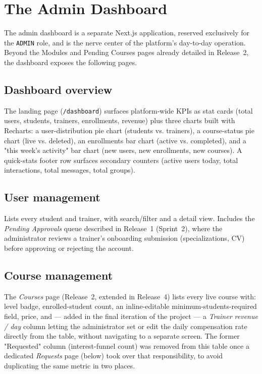 \documentclass[a4paper,12pt]{report}
\begin{document}
\chapter{The Admin Dashboard}
\label{chap:admin-dashboard}

The admin dashboard is a separate Next.js application, reserved
exclusively for the \texttt{ADMIN} role, and is the nerve center of the
platform's day-to-day operation. Beyond the Modules and Pending Courses
pages already detailed in Release~2, the dashboard exposes the following
pages.

\section{Dashboard overview}
The landing page (\texttt{/dashboard}) surfaces platform-wide KPIs as stat
cards (total users, students, trainers, enrollments, revenue) plus three
charts built with Recharts: a user-distribution pie chart
(students vs. trainers), a course-status pie chart (live vs. deleted), an
enrollments bar chart (active vs. completed), and a "this week's activity"
bar chart (new users, new enrollments, new courses). A quick-stats footer
row surfaces secondary counters (active users today, total interactions,
total messages, total groups).

\section{User management}
Lists every student and trainer, with search/filter and a detail view.
Includes the \emph{Pending Approvals} queue described in Release~1
(Sprint~2), where the administrator reviews a trainer's onboarding
submission (specializations, CV) before approving or rejecting the
account.

\section{Course management}
The \emph{Courses} page (Release~2, extended in Release~4) lists every
live course with: level badge, enrolled-student count, an inline-editable
minimum-students-required field, price, and --- added in the final
iteration of the project --- a \emph{Trainer revenue / day} column letting
the administrator set or edit the daily compensation rate directly from
the table, without navigating to a separate screen. The former
"Requested" column (interest-funnel count) was removed from this table
once a dedicated \emph{Requests} page (below) took over that
responsibility, to avoid duplicating the same metric in two places.
\end{document}
